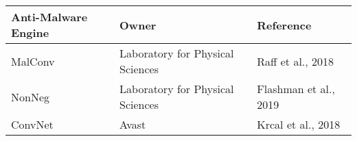 \begin{tabularx}{1\textwidth} { 
  | >{\raggedright\arraybackslash}X 
  | >{\raggedright\arraybackslash}X 
  | >{\raggedright\arraybackslash}X | }
 \hline
 Anti-Malware Engine & Owner & Reference \\ [0.5ex] 
 \hline
 MalConv & Laboratory for Physical Sciences & Raff et al., 2018 \\ 
 \hline
 NonNeg & Laboratory for Physical Sciences & Flashman et al., 2019\\
 \hline
 ConvNet & Avast & Krcal et al., 2018 \\
 \hline
\end{tabularx}